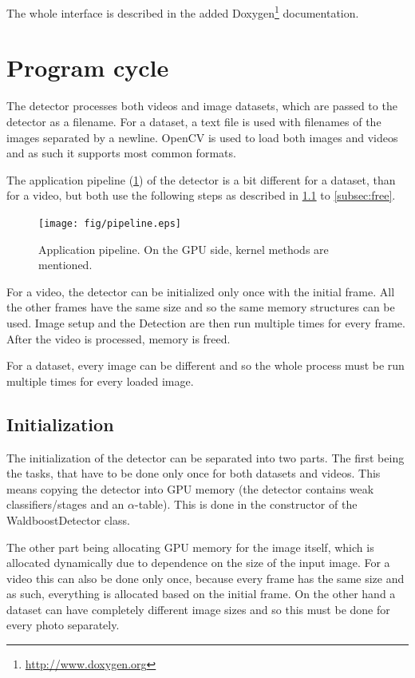 The whole interface is described in the added Doxygen\footnote{\url{http://www.doxygen.org}} documentation.

\section{Program cycle}

The detector processes both videos and image datasets, which are passed to the detector as a filename. For a dataset, a text file is used with filenames of the images separated by a newline. OpenCV is used to load both images and videos and as such it supports most common formats.

The application pipeline (\ref{fig:pipeline}) of the detector is a bit different for a dataset, than for a video, but both use the following steps as described in \ref{subsec:init} to \ref{subsec:free}.

\begin{center}
\begin{figure}[h!]
	\centering\texttt{[image: fig/pipeline.eps]}
	\caption{Application pipeline. On the GPU side, kernel methods are mentioned.}
	\label{fig:pipeline}	
\end{figure}
\end{center}

For a video, the detector can be initialized only once with the initial frame. All the other frames have the same size and so the same memory structures can be used. Image setup and the Detection are then run multiple times for every frame. After the video is processed, memory is freed.

For a dataset, every image can be different and so the whole process must be run multiple times for every loaded image.

\subsection{Initialization}\label{subsec:init}

The initialization of the detector can be separated into two parts. The first being the tasks, that have to be done only once for both datasets and videos. This means copying the detector into GPU memory (the detector contains weak classifiers/stages and an $\alpha$-table). This is done in the constructor of the WaldboostDetector class.

The other part being allocating GPU memory for the image itself, which is allocated dynamically due to dependence on the size of the input image. For a video this can also be done only once, because every frame has the same size and as such, everything is allocated based on the initial frame. On the other hand a dataset can have completely different image sizes and so this must be done for every photo separately.

